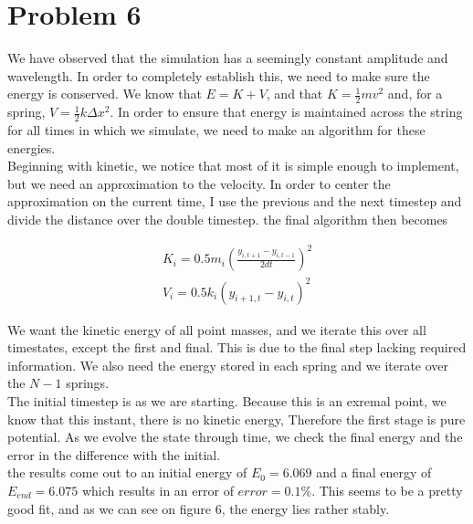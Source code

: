 \documentclass[12pt]{article}
\begin{document}
\section*{Problem 6}
	We have observed that the simulation has a seemingly constant amplitude and wavelength. In order to completely establish this, we need to make sure the energy is conserved. We know that $E = K + V$, and that $K = \frac{1}{2}mv^2$ and, for a spring, $V = \frac{1}{2}k\Delta x^2$. In order to ensure that energy is maintained across the string for all times in which we simulate, we need to make an algorithm for these energies. \\
	Beginning with kinetic, we notice that most of it is simple enough to implement, but we need an approximation to the velocity. In order to center the approximation on the current time, I use the previous and the next timestep and divide the distance over the double timestep. the final algorithm then becomes 
	
\begin{equation}
	\begin{aligned}
		K_i = 0.5m_i(\frac{y_{i, t+1} - y_{i, t-1}}{2dt})^2 \\
		V_i = 0.5k_i(y_{i+1, t} - y_{i, t})^2
	\end{aligned}
\end{equation}
	
	We want the kinetic energy of all point masses, and we iterate this over all timestates, except the first and final. This is due to the final step lacking required information. We also need the energy stored in each spring and we iterate over the $N-1$ springs. \\
	The initial timestep is as we are starting. Because this is an exremal point, we know that this instant, there is no kinetic energy, Therefore the first stage is pure potential. As we evolve the state through time, we check the final energy and the error in the difference with the initial. \\
	the results come out to an initial energy of $E_0 = 6.069$ and a final energy of $E_{end} = 6.075$ which results in an error of $error = 0.1\%$. This seems to be a pretty good fit, and as we can see on figure 6, the energy lies rather stably. 
	
\end{document}
